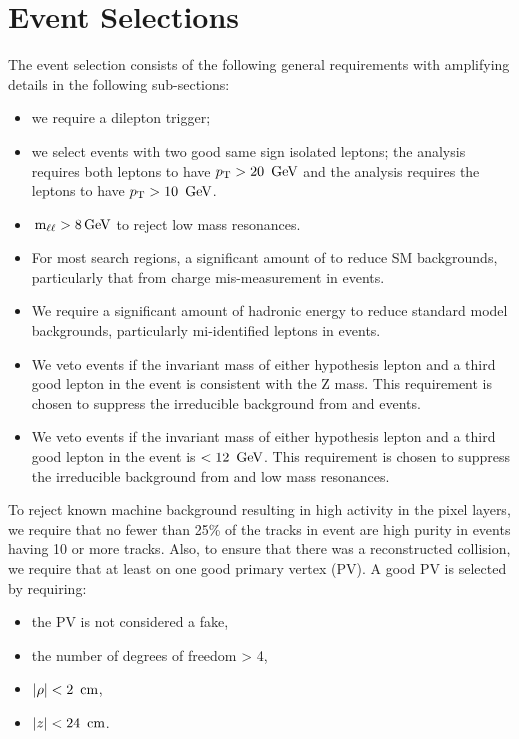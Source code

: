 \section{Event Selections}
\label{sec:evtsel_evt}
The event selection consists of the following general requirements with
amplifying details in the following sub-sections:
\begin{itemize}
\item we require a dilepton trigger;
\item we select events with two good same sign isolated leptons; the \hpt
analysis requires both leptons to have $p_{\mathrm{T}} > 20~\,\text{Ge\hspace{-.08em}V}$ and the \lpt analysis
requires the leptons to have $p_{\mathrm{T}} > 10~\,\text{Ge\hspace{-.08em}V}$.
\item $\,\text{m}_{\ell\ell} > 8 \,\text{Ge\hspace{-.08em}V}$ to reject low mass resonances.
\item For most search regions, a significant amount of \met to reduce SM
backgrounds, particularly that from charge mis-measurement in \Zll events.
\item We require a significant amount of hadronic energy to reduce standard
model backgrounds, particularly mi-identified leptons in \Wj events.
\item We veto events if the invariant mass of either hypothesis lepton and a
third good lepton in the event is consistent with the Z mass. This requirement
is chosen to suppress the irreducible background from \WZ and \ZZ events.
\item We veto events if the invariant mass of either hypothesis lepton and a
third good lepton in the event is $< 12~\,\text{Ge\hspace{-.08em}V}$. This requirement is chosen to
suppress the irreducible background from \gs and low mass resonances.
\end{itemize}

To reject known machine background resulting in high activity in the pixel
layers, we require that no fewer than 25\% of the tracks in event are high
purity in events having 10 or more tracks. Also, to ensure that there was a
reconstructed collision, we require that at least on one good primary vertex
(PV). A good PV is selected by requiring:
\begin{itemize}
\item the PV is not considered a fake,
\item the number of degrees of freedom > 4,
\item $|\rho| < 2~\,\text{cm}$,
\item $|z| < 24~\,\text{cm}$.
\end{itemize}

